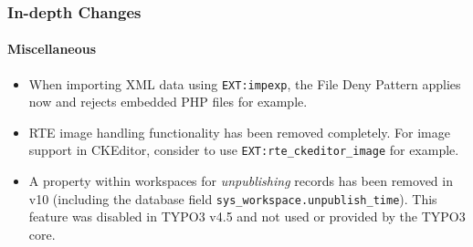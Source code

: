 
\begin{frame}[fragile]
	\frametitle{In-depth Changes}
	\framesubtitle{Miscellaneous}

	\lstset{basicstyle=\tiny\ttfamily}

	\begin{itemize}

		\item When importing XML data using \texttt{EXT:impexp}, the File Deny Pattern applies
			now and rejects embedded PHP files for example.

		\item RTE image handling functionality has been removed completely.
			For image support in CKEditor, consider to use \texttt{EXT:rte\_ckeditor\_image} for example.

		\item A property within workspaces for \textit{unpublishing} records has been removed in v10
			(including the database field \texttt{sys\_workspace.unpublish\_time}). This feature was
			disabled in TYPO3 v4.5 and not used or provided by the TYPO3 core.

	\end{itemize}

\end{frame}


